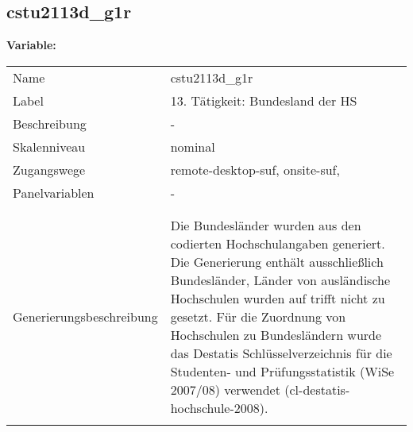 	
	
	\subsection{cstu2113d\_g1r}
	\label{subSection:cstu2113d_g1r}

	\noindent\textbf{Variable:}\\
		\begin{tabular}{lL{11.3cm}}
			\label{tableVariable:cstu2113d_g1r}
			Name & cstu2113d\_g1r \\
			Label & 13. Tätigkeit: Bundesland der HS \\
			Beschreibung & - \\
			Skalenniveau & nominal \\
			Zugangswege &
				remote-desktop-suf,
				onsite-suf,
 \\
			Panelvariablen & -
			 \\
			 \\
 \\
					Generierungsbeschreibung & Die Bundesländer wurden aus den codierten Hochschulangaben generiert. Die Generierung enthält ausschließlich Bundesländer, Länder von ausländische Hochschulen wurden auf trifft nicht zu gesetzt. Für die Zuordnung von Hochschulen zu Bundesländern wurde das Destatis Schlüsselverzeichnis für die Studenten- und Prüfungsstatistik (WiSe 2007/08) verwendet (cl-destatis-hochschule-2008).
				 \\	
			 \\
		\end{tabular}






